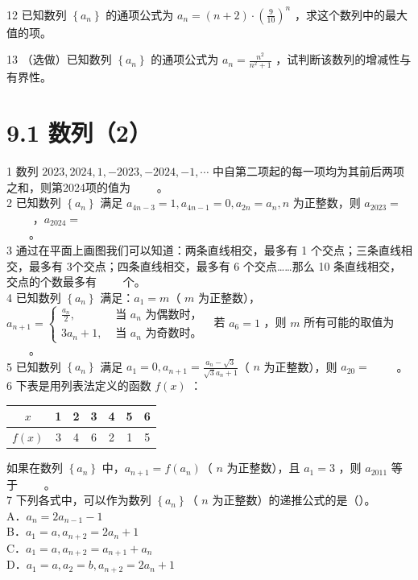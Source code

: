 \documentclass[10pt]{article}
\begin{document}
12 已知数列 \(\left\{a_{n}\right\}\) 的通项公式为 \(a_{n}=(n+2) \cdot\left(\frac{9}{10}\right)^{n}\) ，求这个数列中的最大值的项。

13 （选做）已知数列 \(\left\{a_{n}\right\}\) 的通项公式为 \(a_{n}=\frac{n^{2}}{n^{2}+1}\) ，试判断该数列的增减性与有界性。

\section*{9.1 数列（2）}
1 数列 \(2023,2024,1,-2023,-2024,-1, \cdots\) 中自第二项起的每一项均为其前后两项之和，则第2024项的值为 \(\qquad\)。\\
2 已知数列 \(\left\{a_{n}\right\}\) 满足 \(a_{4 n-3}=1, a_{4 n-1}=0, a_{2 n}=a_{n}, n\) 为正整数，则 \(a_{2023}=\) \(\qquad\) ，\(a_{2024}=\)\\
\(\qquad\)。\\
3 通过在平面上画图我们可以知道：两条直线相交，最多有 1 个交点；三条直线相交，最多有 3个交点；四条直线相交，最多有 6 个交点……那么 10 条直线相交，交点的个数最多有 \(\qquad\)个。\\
4 已知数列 \(\left\{a_{n}\right\}\) 满足：\(a_{1}=m\)（ \(m\) 为正整数），\(a_{n+1}=\left\{\begin{array}{ll}\frac{a_{n}}{2}, & \text { 当 } a_{n} \text { 为偶数时，} \\ 3 a_{n}+1, & \text { 当 } a_{n} \text { 为奇数时。 }\end{array}\right.\) 若 \(a_{6}=1\) ，则 \(m\) 所有可能的取值为 \(\qquad\)。\\
5 已知数列 \(\left\{a_{n}\right\}\) 满足 \(a_{1}=0, a_{n+1}=\frac{a_{n}-\sqrt{3}}{\sqrt{3} a_{n}+1}\)（ \(n\) 为正整数），则 \(a_{20}=\) \(\qquad\)。\\
6 下表是用列表法定义的函数 \(f(x)\) ：

\begin{center}
\begin{tabular}{|c|c|c|c|c|c|c|}
\hline
\(x\) & 1 & 2 & 3 & 4 & 5 & 6 \\
\hline
\(f(x)\) & 3 & 4 & 6 & 2 & 1 & 5 \\
\hline
\end{tabular}
\end{center}

如果在数列 \(\left\{a_{n}\right\}\) 中，\(a_{n+1}=f\left(a_{n}\right)\)（ \(n\) 为正整数），且 \(a_{1}=3\) ，则 \(a_{2011}\) 等于 \(\qquad\)。\\
7 下列各式中，可以作为数列 \(\left\{a_{n}\right\}\)（ \(n\) 为正整数）的递推公式的是（）。\\
A．\(a_{n}=2 a_{n-1}-1\)\\
B．\(a_{1}=a, a_{n+2}=2 a_{n}+1\)\\
C．\(a_{1}=a, a_{n+2}=a_{n+1}+a_{n}\)\\
D．\(a_{1}=a, a_{2}=b, a_{n+2}=2 a_{n}+1\)
\end{document}
